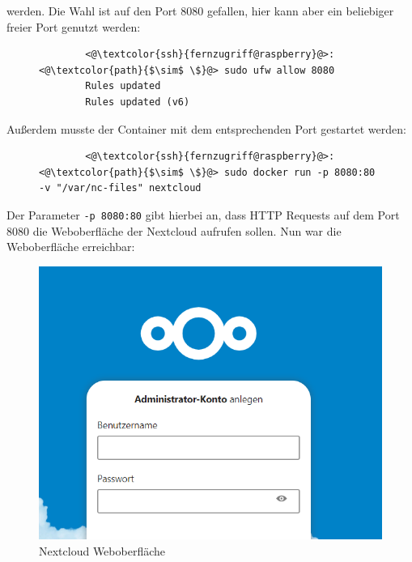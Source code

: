 \documentclass[a4paper, 12pt]{scrartcl}
\begin{document}
werden. Die Wahl ist auf den Port 8080 gefallen, hier kann aber ein beliebiger freier Port genutzt werden:
\begin{figure}[H]
    \begin{mdframed}[backgroundcolor=bbg]
        \begin{lstlisting}
        <@\textcolor{ssh}{fernzugriff@raspberry}@>:<@\textcolor{path}{$\sim$ \$}@> sudo ufw allow 8080
        Rules updated
        Rules updated (v6)
        \end{lstlisting}
    \end{mdframed}
    \label{lst:port_nextcloud}
\end{figure}
Außerdem musste der Container mit dem entsprechenden Port gestartet werden:
\begin{figure}[H]
    \begin{mdframed}[backgroundcolor=bbg]
        \begin{lstlisting}
        <@\textcolor{ssh}{fernzugriff@raspberry}@>:<@\textcolor{path}{$\sim$ \$}@> sudo docker run -p 8080:80 -v "/var/nc-files" nextcloud
        \end{lstlisting}
    \end{mdframed}
    \label{lst:port_nextcloud}
\end{figure}
Der Parameter \lstinline[basicstyle={\small\ttfamily\color{black}}]|-p 8080:80| gibt hierbei an, dass HTTP Requests auf dem Port 8080 die Weboberfläche der Nextcloud aufrufen
sollen. Nun war die Weboberfläche erreichbar:
\begin{figure}[H]
    \begin{center}
        \includegraphics[scale=0.5]{Bilder/nextcloud_web.png}
        \caption{Nextcloud Weboberfläche}
    \end{center}
\end{figure}
\end{document}
